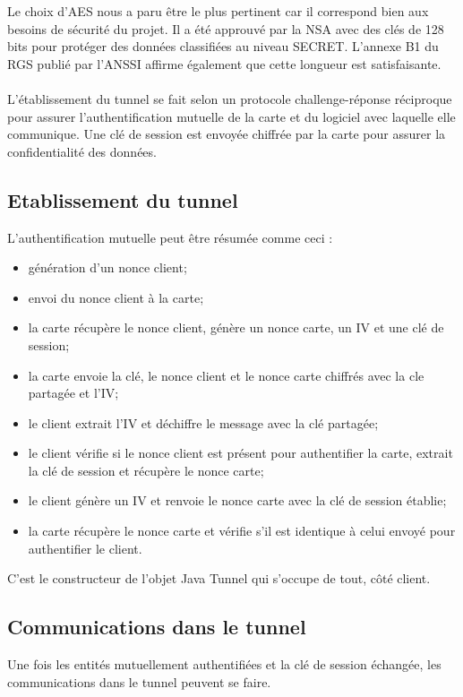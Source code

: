 \documentclass[a4paper,11pt,french]{article}
\begin{document}
Le choix d'AES nous a paru être le plus pertinent car il correspond bien aux 
besoins de sécurité du projet. Il a été approuvé par la NSA avec des clés de 128
bits pour protéger des données classifiées au niveau SECRET. L'annexe B1 du RGS
publié par l'ANSSI affirme également que cette longueur est satisfaisante. 

\paragraph{}
L'établissement du tunnel se fait selon un protocole challenge-réponse 
réciproque pour assurer l'authentification mutuelle de la carte et du logiciel 
avec laquelle elle communique. Une clé de session est envoyée chiffrée par la 
carte pour assurer la confidentialité des données.

\subsection{Etablissement du tunnel}
L'authentification mutuelle peut être résumée comme ceci : 
\begin{itemize}
    \item génération d'un nonce client;
    \item envoi du nonce client à la carte;
    \item la carte récupère le nonce client, génère un nonce carte, un IV et une clé
        de session;
    \item la carte envoie la clé, le nonce client et le nonce carte chiffrés avec la
        cle partagée et l'IV;
    \item le client extrait l'IV et déchiffre le message avec la clé partagée;
    \item le client vérifie si le nonce client est présent pour authentifier la 
        carte, extrait la clé de session et récupère le nonce carte;
    \item le client génère un IV et renvoie le nonce carte avec la clé de session 
        établie;
    \item la carte récupère le nonce carte et vérifie s'il est identique à celui 
        envoyé pour authentifier le client.
\end{itemize}

C'est le constructeur de l'objet Java \og{}Tunnel \fg{} qui s'occupe de tout,
côté client.

\subsection{Communications dans le tunnel}
Une fois les entités mutuellement authentifiées et la clé de session échangée, 
les communications dans le tunnel peuvent se faire. 
\end{document}
